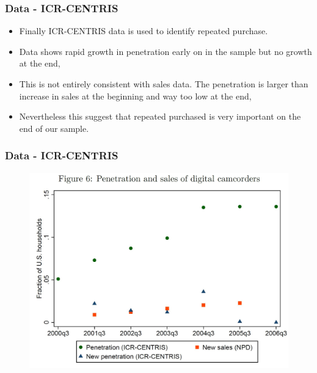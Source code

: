 \documentclass{beamer}
\theoremstyle{definition}
\begin{document}
\begin{frame}
  \frametitle{Data - ICR-CENTRIS}

  \begin{itemize}
    \item Finally ICR-CENTRIS data is used to identify repeated purchase. 
    \item Data shows rapid growth in penetration early on in the sample but no
      growth at the end,
    \item This is not entirely consistent with sales data. The penetration is
      larger than increase in sales at the beginning and way too low at the
      end,
    \item Nevertheless this suggest that repeated purchased is very important
      on the end of our sample.
  \end{itemize}
\end{frame}

\begin{frame}
  \frametitle{Data - ICR-CENTRIS}

  \begin{figure}
    \includegraphics[width=\linewidth]{6.JPG}
  \end{figure}
\end{frame}
\end{document}

